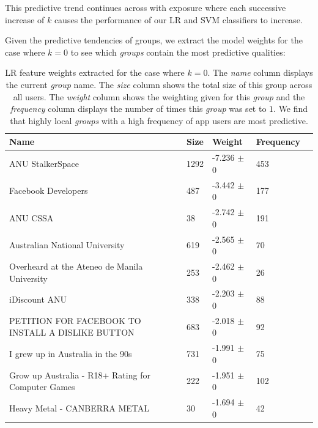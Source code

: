 This predictive trend continues across with exposure where each successive increase of $k$ causes the performance of our LR and SVM 
classifiers to increase.

\clearpage

Given the predictive tendencies of groups, we extract the model weights for the case where $k=0$ to see which \emph{groups} 
contain the most predictive qualities:

\begin{table}[h]
\begin{minipage}[b]{1.0\textwidth}
\centering
  \begin{tabular}{|l|l|l|l|l|} %
  \hline
  \textbf{Name} & \textbf{Size} & \textbf{Weight} & \textbf{Frequency} \\ \hline
\small{ANU StalkerSpace} & 1292 & -7.236 $\pm$ 0 & 453 \\ \hline
\small{Facebook Developers} & 487 & -3.442 $\pm$ 0 & 177 \\ \hline
\small{ANU CSSA} & 38 & -2.742 $\pm$ 0 & 191 \\ \hline
\small{Australian National University} & 619 & -2.565 $\pm$ 0 & 70 \\ \hline
\small{Overheard at the Ateneo de Manila University} & 253 & -2.462 $\pm$ 0 & 26 \\ \hline
\small{iDiscount ANU} & 338 & -2.203 $\pm$ 0 & 88 \\ \hline
\small{PETITION FOR FACEBOOK TO INSTALL A DISLIKE BUTTON} & 683 & -2.018 $\pm$ 0 & 92 \\ \hline
\small{I grew up in Australia in the 90s} & 731 & -1.991 $\pm$ 0 & 75 \\ \hline
\small{Grow up Australia - R18+ Rating for Computer Games} & 222 & -1.951 $\pm$ 0 & 102 \\ \hline
\small{Heavy Metal - CANBERRA METAL} & 30 & -1.694 $\pm$ 0 & 42 \\ \hline
  \end{tabular}
  \caption{LR feature weights extracted for the case where $k=0$. The \emph{name} column displays the current \emph{group} name.
  The \emph{size} column shows the total size of this group across all users.
  The \emph{weight} column shows the weighting given for this \emph{group} and the \emph{frequency} column displays the number of times 
  this \emph{group} was set to $1$. We find that highly local \emph{groups} with a high frequency of app users are most predictive.}
\end{minipage}
\end{table}

